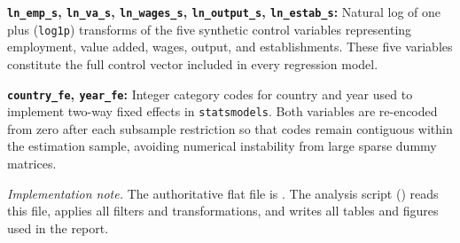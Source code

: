 \documentclass[12pt,letterpaper]{article}
\begin{document}
\noindent\textbf{\texttt{ln\_emp\_s}, \texttt{ln\_va\_s}, \texttt{ln\_wages\_s}, \texttt{ln\_output\_s}, \texttt{ln\_estab\_s}:}
Natural log of one plus (\texttt{log1p}) transforms of the five synthetic control variables representing employment, value added, wages, output, and establishments. These five variables constitute the full control vector included in every regression model.

\noindent\textbf{\texttt{country\_fe}, \texttt{year\_fe}:}
Integer category codes for country and year used to implement two-way fixed effects in \texttt{statsmodels}. Both variables are re-encoded from zero after each subsample restriction so that codes remain contiguous within the estimation sample, avoiding numerical instability from large sparse dummy matrices.

\vspace{0.35em}
\noindent\textit{Implementation note.} The authoritative flat file is . The analysis script () reads this file, applies all filters and transformations, and writes all tables and figures used in the report.

\endgroup

\newpage
\singlespacing
{}
\setlength{\bibhang}{0.5in}
\end{document}
